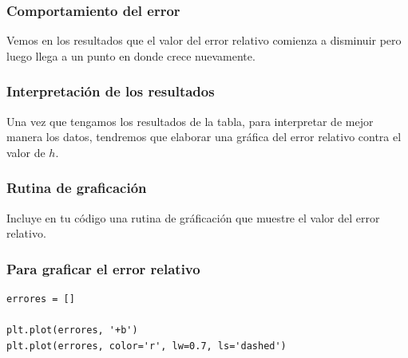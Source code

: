 \documentclass[12pt]{beamer}
\begin{document}
\begin{frame}[fragile]
\frametitle{Comportamiento del error}
Vemos en los resultados que el valor del error relativo comienza a disminuir pero luego llega a un punto en donde crece nuevamente.
\\
\bigskip
\pause
{}
\end{frame}
\begin{frame}[fragile]
\frametitle{Interpretación de los resultados}
Una vez que tengamos los resultados de la tabla, para interpretar de mejor manera los datos, tendremos que elaborar una gráfica del error relativo contra el valor de $h$.
\end{frame}
\begin{frame}[fragile]
\frametitle{Rutina de graficación}
Incluye en tu código una rutina de gráficación que muestre el valor del error relativo.
\end{frame}
\begin{frame}[fragile]
\frametitle{Para graficar el error relativo}
\begin{verbatim}
errores = []

plt.plot(errores, '+b')
plt.plot(errores, color='r', lw=0.7, ls='dashed')
\end{verbatim}
\end{frame}
\end{document}

